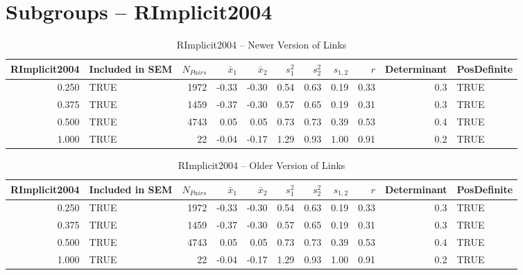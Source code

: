 \documentclass{article}\usepackage[]{graphicx}\usepackage[]{color}
\begin{document}
\section{Subgroups --  RImplicit2004 }%
\begin{table}[ht]
\centering
\begin{tabular}{rlrrrrrrrrl}
  \hline
RImplicit2004 & Included in SEM & $N_{Pairs}$ & $\bar{x}_1$ & $\bar{x}_2$ & $s_1^2$ & $s_2^2$ & $s_{1,2}$ & $r$ & Determinant & PosDefinite \\ 
  \hline
0.250 & TRUE & 1972 & -0.33 & -0.30 & 0.54 & 0.63 & 0.19 & 0.33 & 0.3 & TRUE \\ 
  0.375 & TRUE & 1459 & -0.37 & -0.30 & 0.57 & 0.65 & 0.19 & 0.31 & 0.3 & TRUE \\ 
  0.500 & TRUE & 4743 & 0.05 & 0.05 & 0.73 & 0.73 & 0.39 & 0.53 & 0.4 & TRUE \\ 
  1.000 & TRUE & 22 & -0.04 & -0.17 & 1.29 & 0.93 & 1.00 & 0.91 & 0.2 & TRUE \\ 
   \hline
\end{tabular}
\caption{RImplicit2004 -- Newer Version of Links} 
\end{table}
\begin{table}[ht]
\centering
\begin{tabular}{rlrrrrrrrrl}
  \hline
RImplicit2004 & Included in SEM & $N_{Pairs}$ & $\bar{x}_1$ & $\bar{x}_2$ & $s_1^2$ & $s_2^2$ & $s_{1,2}$ & $r$ & Determinant & PosDefinite \\ 
  \hline
0.250 & TRUE & 1972 & -0.33 & -0.30 & 0.54 & 0.63 & 0.19 & 0.33 & 0.3 & TRUE \\ 
  0.375 & TRUE & 1459 & -0.37 & -0.30 & 0.57 & 0.65 & 0.19 & 0.31 & 0.3 & TRUE \\ 
  0.500 & TRUE & 4743 & 0.05 & 0.05 & 0.73 & 0.73 & 0.39 & 0.53 & 0.4 & TRUE \\ 
  1.000 & TRUE & 22 & -0.04 & -0.17 & 1.29 & 0.93 & 1.00 & 0.91 & 0.2 & TRUE \\ 
   \hline
\end{tabular}
\caption{RImplicit2004 -- Older Version of Links} 
\end{table}


\end{document}
